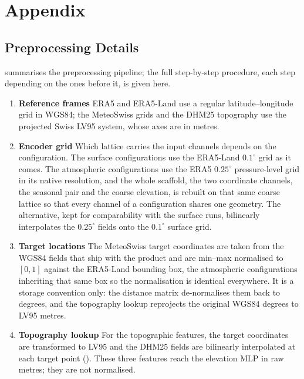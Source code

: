 \appendix
\chapter{Appendix}\label{ch:appendix}

\section{Preprocessing Details}\label{sec:app-preprocessing}

 summarises the preprocessing pipeline; the full step-by-step procedure,
each step depending on the ones before it, is given here.

\begin{enumerate}
    \item \textbf{Reference frames} ERA5 and ERA5-Land use a regular latitude--longitude grid in WGS84; the MeteoSwiss grids and the DHM25 topography use the projected Swiss LV95 system, whose axes are in metres.
    \item \textbf{Encoder grid}\label{item:data-encoder-grid} Which lattice carries the input channels depends on the configuration. The surface configurations use the ERA5-Land $0.1^{\circ}$ grid as it comes. The atmospheric configurations use the ERA5 $0.25^{\circ}$ pressure-level grid in its native resolution, and the whole scaffold, the two coordinate channels, the seasonal pair and the coarse elevation, is rebuilt on that same coarse lattice so that every channel of a configuration shares one geometry. The alternative, kept for comparability with the surface runs, bilinearly interpolates the $0.25^{\circ}$ fields onto the $0.1^{\circ}$ surface grid.
    \item \textbf{Target locations}\label{item:data-target-locations} The MeteoSwiss target coordinates are taken from the WGS84 fields that ship with the product and are min--max normalised to $[0,1]$ against the ERA5-Land bounding box, the atmospheric configurations inheriting that same box so the normalisation is identical everywhere. It is a storage convention only: the distance matrix de-normalises them back to degrees, and the topography lookup reprojects the original WGS84 degrees to LV95 metres.
    \item \textbf{Topography lookup} For the topographic features, the target coordinates are transformed to LV95 and the DHM25 fields are bilinearly interpolated at each target point (). These three features reach the elevation MLP in raw metres; they are not normalised.

\end{enumerate}
